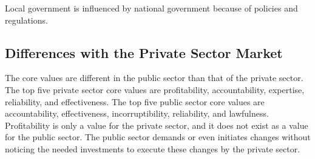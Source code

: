 \begin{remark}
	Local government is influenced by national government because of policies and regulations.
\end{remark}
\subsection{Differences with the Private Sector Market}
\label{sub:tbdifferenceprivatesector}

The core values are different in the public sector than that of the private sector. The top five private sector core values are profitability, accountability, expertise, reliability, and effectiveness. The top five public sector core values are accountability, effectiveness, incorruptibility, reliability, and lawfulness. \parencite{Wal2008} Profitability is only a value for the private sector, and it does not exist as a value for the public sector.  The public sector demands or even initiates changes without noticing the needed investments to execute these changes by the private sector.
